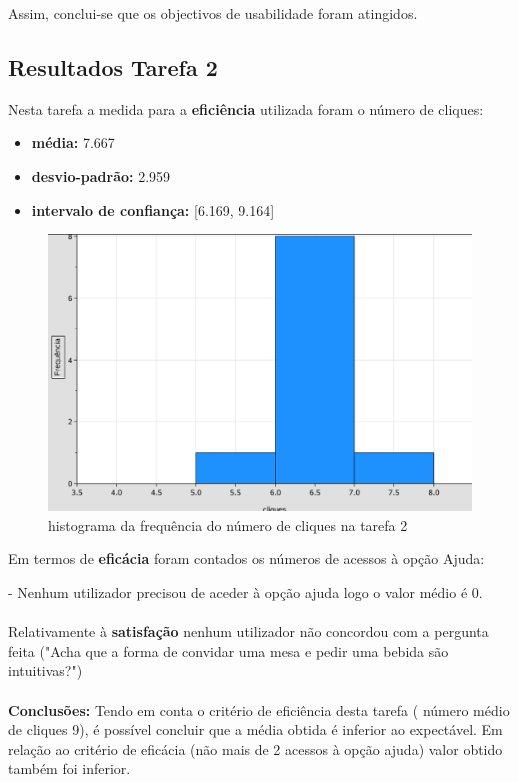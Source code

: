 \documentclass{article}
\begin{document}
 Assim, conclui-se que os objectivos de usabilidade foram atingidos.

\subsection*{Resultados Tarefa 2}
Nesta tarefa a medida para a \textbf{eficiência} utilizada foram o número de cliques:
\begin{itemize}
\item\textbf{média:} 7.667
\item\textbf{desvio-padrão:} 2.959
\item\textbf{intervalo de confiança:} [6.169, 9.164]
\end{itemize}
\begin{figure}[H]
\centering
\includegraphics[scale=0.35]{grafico2}
\caption{histograma da frequência do número de cliques na tarefa 2}
\end{figure} Em termos de \textbf{eficácia} foram contados os números de acessos à opção Ajuda:

 - Nenhum utilizador precisou de aceder à opção ajuda logo o valor médio é 0.\\\\
Relativamente à \textbf{satisfação} nenhum utilizador não concordou com a pergunta feita ("Acha que a forma de convidar uma mesa e pedir uma bebida são intuitivas?")\\\\
\textbf{Conclusões:}
Tendo em conta o critério de eficiência desta tarefa ( número médio de cliques 9), é possível concluir que a média obtida é inferior ao expectável. Em relação ao critério de eficácia (não mais de 2 acessos à opção ajuda) valor obtido também foi inferior.
\end{document}
